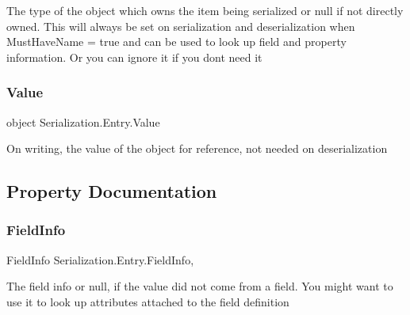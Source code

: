 The type of the object which owns the item being serialized or null if not directly owned. This will always be set on serialization and deserialization when Must\+Have\+Name = true and can be used to look up field and property information. Or you can ignore it if you don\textquotesingle{}t need it 

\mbox{\label{class_serialization_1_1_entry_a17a664469636a801c96b7224972cf928}} 
\subsubsection{\texorpdfstring{Value}{Value}}
{\footnotesize\ttfamily object Serialization.\+Entry.\+Value}



On writing, the value of the object for reference, not needed on deserialization 



\subsection{Property Documentation}
\mbox{\label{class_serialization_1_1_entry_ac9c4d67292047b6a3f9a3d3fcdccb09e}} 
\subsubsection{\texorpdfstring{Field\+Info}{FieldInfo}}
{\footnotesize\ttfamily Field\+Info Serialization.\+Entry.\+Field\+Info\hspace{0.3cm}{\ttfamily [get]}, {\ttfamily [set]}}



The field info or null, if the value did not come from a field. You might want to use it to look up attributes attached to the field definition 

\mbox{\label{class_serialization_1_1_entry_a079414059819b92c873921247bc0686b}} 
